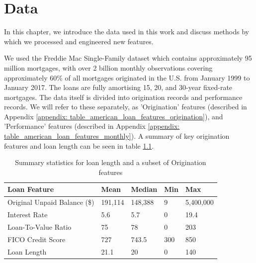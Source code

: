 \chapter{Data}
        In this chapter, we introduce the data used in this work and discuss methods by which we processed and engineered new features. 
        
         We used the Freddie Mac Single-Family dataset which contains approximately 95 million mortgages, with over 2 billion monthly observations covering approximately 60\% of all mortgages originated in the U.S. from January 1999 to January 2017. The loans are fully amortising 15, 20, and 30-year fixed-rate mortgages. The data itself is divided into origination records and performance records. We will refer to these separately, as 'Origination' features (described in Appendix \ref{appendix: table_american_loan_features_origination}), and 'Performance' features (described in Appendix \ref{appendix: table_american_loan_features_monthly}). A summary of key origination features and loan length can be seen in table \ref{4: summary_features}.
        
        
        \begin{center}
            \begin{table}[]
                \centering
                \begin{tabular}{|p{6cm}|p{1.75cm}|p{1.75cm}|p{1.75cm}|p{1.75cm}|}
                    \hline \textbf{Loan Feature} & \textbf{Mean} & \textbf{Median} & \textbf{Min} & \textbf{Max}  \\ \hline \hline
                    
                    Original Unpaid Balance (\$) & 191,114 & 148,388 & 9 & 5,400,000 \\ \hline
                    Interest Rate & 5.6 & 5.7 & 0 & 19.4 \\ \hline
                    Loan-To-Value Ratio & 75 & 78 & 0 & 203 \\ \hline
                    FICO Credit Score & 727 & 743.5 & 300 & 850 \\ \hline
                    Loan Length & 21.1 & 20 & 0 & 140 \\ \hline
                \end{tabular}
                \caption{Summary statistics for loan length and a subset of Origination features}
                \label{4: summary_features}
            \end{table}
        \end{center}
        
